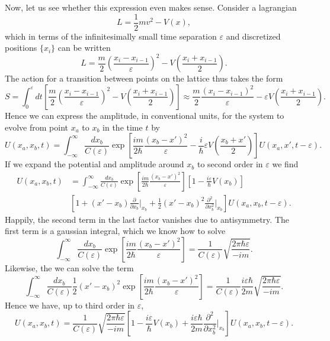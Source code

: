 \documentclass[twoside,utf8]{article}
\begin{document}
Now, let us see whether this expression even makes sense. Consider a lagrangian
\[
L = \frac{1}{2}mv^2-V(x),
\]
which in terms of the infinitesimally small time separation $\varepsilon$ and discretized positions $\{x_i\}$ can be written
\[
L = \frac{m}{2}\left(\frac{x_i-x_{i-1}}{\varepsilon}\right)^2-V\left(\frac{x_i+x_{i-1}}{2}\right).
\]
The action for a transition between points on the lattice thus takes the form
\[
S = \int_0^\varepsilon dt \left[ \frac{m}{2}\left(\frac{x_i-x_{i-1}}{\varepsilon}\right)^2-V\left(\frac{x_i+x_{i-1}}{2}\right) \right]
\approx
 \frac{m}{2}\frac{\left(x_i-x_{i-1}\right)^2}{\varepsilon}-\varepsilon V\left(\frac{x_i+x_{i-1}}{2}\right).
\]
Hence we can express the amplitude, in conventional units, for the system to evolve from point $x_a$ to $x_b$ in the time $t$ by
\[
U(x_a,x_b,t) = \int_{-\infty}^\infty \frac{dx_b}{C(\varepsilon)} \exp \left[
\frac{im}{2\hbar}\frac{\left(x_b-x'\right)^2}{\varepsilon}-\frac{i}{\hbar}\varepsilon V\left(\frac{x_b+x'}{2}\right)
\right]U(x_a,x',t-\varepsilon).
\]
If we expand the potential and amplitude around $x_b$ to second order in $\varepsilon$ we find
\begin{equation*}
\begin{align}
U(x_a,x_b,t) &= \int_{-\infty}^\infty \frac{dx_b}{C(\varepsilon)} \exp \left[
\frac{im}{2\hbar}\frac{\left(x_b-x'\right)^2}{\varepsilon}\right]
\left[1-\frac{i\varepsilon}{\hbar} V\left(x_b\right)\right]\\
&\left[1+(x'-x_b)\frac{\partial}{\partial x_b}\big|_{x_b}
+\frac{1}{2}(x'-x_b)^2\frac{\partial^2}{\partial x_b^2}\big|_{x_b}
\right]
U(x_a,x_b,t-\varepsilon).
\end{align}
\end{equation*}
Happily, the second term in the last factor vanishes due to antisymmetry. The first term is a gaussian integral, which we know how to solve
\[
\int_{-\infty}^\infty \frac{dx_b}{C(\varepsilon)} \exp \left[
\frac{im}{2\hbar}\frac{\left(x_b-x'\right)^2}{\varepsilon}\right]
= \frac{1}{C(\varepsilon)}\sqrt{\frac{2\pi\hbar \varepsilon}{-im}}.
\]
Likewise, the we can solve the term
\[
\int_{-\infty}^\infty \frac{dx_b}{C(\varepsilon)} \frac{1}{2}(x'-x_b)^2\exp \left[
\frac{im}{2\hbar}\frac{\left(x_b-x'\right)^2}{\varepsilon}\right]
= \frac{1}{C(\varepsilon)}\frac{i\varepsilon\hbar}{2m}\sqrt{\frac{2\pi\hbar \varepsilon}{-im}}.
\]
Hence we have, up to third order in $\varepsilon$,
\[
U(x_a,x_b,t) = \frac{1}{C(\varepsilon)}\sqrt{\frac{2\pi\hbar \varepsilon}{-im}}\left[1-\frac{i\varepsilon}{\hbar} V\left(x_b\right)+\frac{i\varepsilon \hbar}{2m} \frac{\partial^2}{\partial x_b^2}\big|_{x_b}\right]
U(x_a,x_b,t-\varepsilon).
\]
\end{document}
